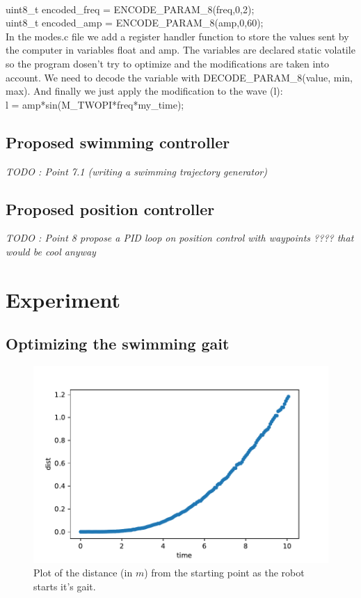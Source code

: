 \documentclass[11pt]{article}
\begin{document}
{\\
uint8\_t encoded\_freq = ENCODE\_PARAM\_8(freq,0,2);
\\
uint8\_t encoded\_amp = ENCODE\_PARAM\_8(amp,0,60);
\\
In the modes.c file we add a register handler function to store the values sent by the computer in variables float and amp. The variables are declared static volatile so the program dosen't try to optimize and the modifications are taken into account. We need to decode the variable with DECODE\_PARAM\_8(value, min, max). And finally we just apply the modification to the wave (l):
\\
l = amp*sin(M\_TWOPI*freq*my\_time);
}

\subsection{Proposed swimming controller}

\textit{TODO : Point 7.1 (writing a swimming trajectory generator)}


\subsection{Proposed position controller}

\textit{TODO : Point 8 propose a PID loop on position control with waypoints ???? that would be cool anyway}

\section{Experiment}

\subsection{Optimizing the swimming gait}

\begin{figure}
    \centering
    \includegraphics{figures/out-20-1_5-1.pdf}
    \caption{Plot of the distance (in $m$) from the starting point as the robot starts it's gait.}
    \label{fig:trajectory_1}
\end{figure}
\end{document}
